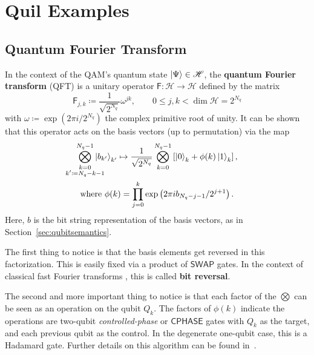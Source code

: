 \documentclass[conference]{IEEEtran}
\newcommand{\defn}[1]{\textbf{#1}}
\newcommand{\SWAP}{\ensuremath{\mathsf{SWAP}}}
\newcommand{\CPHASE}{\ensuremath{\mathsf{CPHASE}}}
\newcommand{\Hil}{\ensuremath{\mathscr{H}}}
\begin{document}
\section{Quil Examples}

\subsection{Quantum Fourier Transform}
In the context of the QAM's quantum state $\ket{\Psi}\in\Hil$, the \defn{quantum Fourier transform} (QFT) \cite[\S5.1]{nielsen2010quantum} is a unitary operator $\textsf{F}:\Hil\to\Hil$ defined by the matrix
\begin{equation}
\textsf{F}_{j,k} \coloneqq \frac{1}{\sqrt{2^{N_q}}}\omega^{jk},\qquad 0\le j,k < \dim\Hil = 2^{N_q}
\end{equation}
with $\omega\coloneqq \exp(2\pi i/2^{N_q})$ the complex primitive root of unity. It can be shown that this operator acts on the basis vectors (up to permutation) via the map
\begin{gather}
\bigotimes_{\mathclap{\substack{k=0\\k'\coloneqq N_q-k-1}}}^{N_q-1} \ket{b_{k'}}_{k'}
\mapsto
\frac{1}{\sqrt{2^{N_q}}}\bigotimes_{k=0}^{N_q-1}
\left[\ket{0}_{k} + \phi(k)\ket{1}_{k}\right],\\
\text{where } \phi(k) = \prod_{j=0}^k \exp\left(2\pi i b_{N_q-j-1}/2^{j+1}\right).\nonumber
\end{gather}
Here, $b$ is the bit string representation of the basis vectors, as in Section~\ref{sec:qubitsemantics}.

The first thing to notice is that the basis elements get reversed in this factorization. This is easily fixed via a product of \SWAP{} gates. In the context of classical fast Fourier transforms \cite{cooley1965algorithm}, this is called \defn{bit reversal}.

The second and more important thing to notice is that each factor of the $\bigotimes$ can be seen as an operation on the qubit $Q_{k}$. The factors of $\phi(k)$ indicate the operations are two-qubit \emph{controlled-phase} or \CPHASE{} gates with $Q_{k}$ as the target, and each previous qubit as the control. In the degenerate one-qubit case, this is a Hadamard gate. Further details on this algorithm can be found in~\cite{nielsen2010quantum}.
\end{document}
